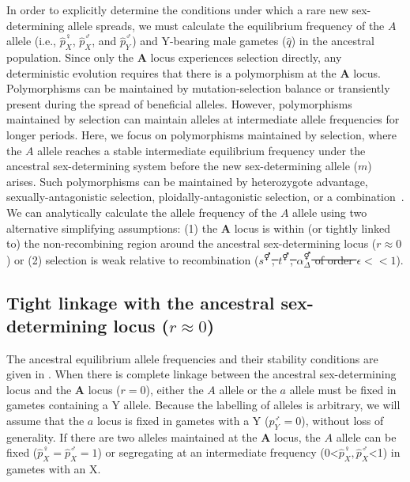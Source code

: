 \documentclass[10pt,letterpaper]{article}
\providecommand{\DIFaddtex}[1]{{\protect\color{blue}\uwave{#1}}} %
\providecommand{\DIFdeltex}[1]{{\protect\color{red}\sout{#1}}}                      %
\providecommand{\DIFaddbegin}{} %
\providecommand{\DIFaddend}{} %
\providecommand{\DIFdelbegin}{} %
\providecommand{\DIFdelend}{} %
\providecommand{\DIFadd}[1]{\texorpdfstring{\DIFaddtex{#1}}{#1}} %
\providecommand{\DIFdel}[1]{\texorpdfstring{\DIFdeltex{#1}}{}} %
\newcommand{\DIFscaledelfig}{0.5}
\newlength{\DIFdelgraphicswidth} %
\newlength{\DIFdelgraphicsheight} %
\newcommand{\DIFaddincludegraphics}[2][]{{\color{blue}\fbox{\DIFOincludegraphics[#1]{#2}}}} %
\newcommand{\DIFdelincludegraphics}[2][]{%
\sbox{\DIFdelgraphicsbox}{\DIFOincludegraphics[#1]{#2}}%
\settoboxwidth{\DIFdelgraphicswidth}{\DIFdelgraphicsbox} %
\settoboxtotalheight{\DIFdelgraphicsheight}{\DIFdelgraphicsbox} %
\scalebox{\DIFscaledelfig}{%
\parbox[b]{\DIFdelgraphicswidth}{\usebox{\DIFdelgraphicsbox}\\[-\baselineskip] \rule{\DIFdelgraphicswidth}{0em}}\llap{\resizebox{\DIFdelgraphicswidth}{\DIFdelgraphicsheight}{%
\setlength{\unitlength}{\DIFdelgraphicswidth}%
\begin{picture}(1,1)%
\thicklines\linethickness{2pt} %
{\color[rgb]{1,0,0}\put(0,0){\framebox(1,1){}}}%
{\color[rgb]{1,0,0}\put(0,0){\line( 1,1){1}}}%
{\color[rgb]{1,0,0}\put(0,1){\line(1,-1){1}}}%
\end{picture}%
}\hspace*{3pt}}} %
} %
\DeclareRobustCommand{\DIFaddbegin}{\DIFOaddbegin \let\includegraphics\DIFaddincludegraphics} %
\DeclareRobustCommand{\DIFaddend}{\DIFOaddend \let\includegraphics\DIFOincludegraphics} %
\DeclareRobustCommand{\DIFdelbegin}{\DIFOdelbegin \let\includegraphics\DIFdelincludegraphics} %
\DeclareRobustCommand{\DIFdelend}{\DIFOaddend \let\includegraphics\DIFOincludegraphics} %
\begin{document}
In order to explicitly determine the conditions under which a rare new sex-determining allele spreads, we must calculate the equilibrium frequency of the $A$ allele (i.e., $\hat{p}^\female_X$, $\hat{p}^\male_X$, and $\hat{p}^\male_Y$) and Y-bearing male gametes ($\hat{q}$) in the ancestral population. 
Since only the $\mathbf{A}$ locus experiences selection directly, any deterministic evolution requires that there is a polymorphism at the $\mathbf{A}$ locus. 
Polymorphisms can be maintained by mutation-selection balance or transiently present during the spread of beneficial alleles. 
However, polymorphisms maintained by selection can maintain alleles at intermediate allele frequencies for longer periods. 
Here, we focus on polymorphisms maintained by selection, where the $A$ allele reaches a stable intermediate equilibrium frequency under the ancestral sex-determining system before the new sex-determining allele ($m$) arises. 
Such polymorphisms can be maintained by heterozygote advantage, sexually-antagonistic selection, ploidally-antagonistic selection, or a combination~\cite{Immler:2012tl}.
We can analytically calculate the allele frequency of the $A$ allele using two alternative simplifying assumptions: 
(1) the $\mathbf{A}$ locus is within (or tightly linked to) the non-recombining region around the ancestral sex-determining locus ($r \approx 0$) or (2) selection is weak relative to recombination (\DIFdelbegin \DIFdel{$s^\Hermaphrodite$, $t^\Hermaphrodite$, $\alpha_{\Delta}^\Hermaphrodite$ of order $\epsilon<<1$}\DIFdelend \DIFaddbegin \DIFadd{$s^\circ$, $t^\circ$, $\alpha_{\Delta}^\circ$ $<<$ $r$}\DIFaddend ). 

\subsection*{Tight linkage with the ancestral sex-determining locus ($r \approx 0$)}

The ancestral equilibrium allele frequencies and their stability conditions are given in . 
When there is complete linkage between the ancestral sex-determining locus and the $\mathbf{A}$ locus ($r=0$), either the $A$ allele or the $a$ allele must be fixed in gametes containing a Y allele. 
Because the labelling of alleles is arbitrary, we will assume that the $a$ locus is fixed in gametes with a Y ($p^\male_Y=0$), without loss of generality. 
If there are two alleles maintained at the $\mathbf{A}$ locus, the $A$ allele can be fixed ($\hat{p}^\female_X=\hat{p}^\male_X=1$) or segregating at an intermediate frequency (0<$\hat{p}^\female_X, \hat{p}^\male_X$<1) in gametes with an X. 
\end{document}

